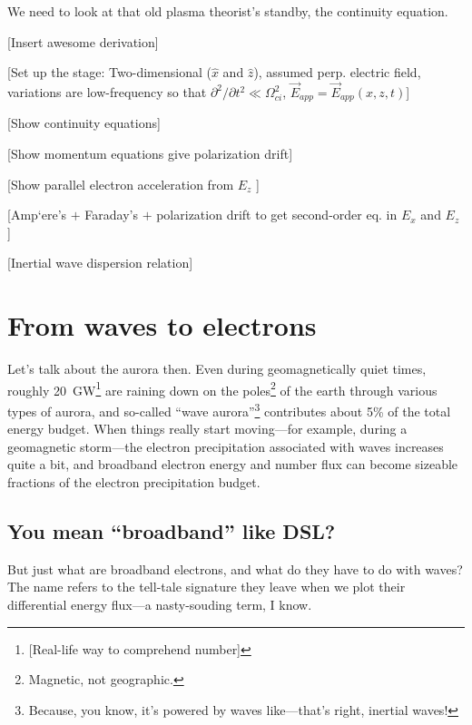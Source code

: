 We need to look at that old plasma theorist's standby, the continuity
equation.

[Insert awesome derivation]

[Set up the stage: Two-dimensional ($\hat{x}$ and $\hat{z}$), assumed
perp. electric field, variations are low-frequency so that $\partial^2
/ \partial t^2 \ll \Omega_{ci}^2$, $\vec{E}_{app} = \vec{E}_{app} (x,
z, t)$]

[Show continuity equations]

[Show momentum equations give polarization drift]

[Show parallel electron acceleration from $E_z$ ]

[Amp`{e}re's $+$ Faraday's $+$ polarization drift to get second-order eq. in $E_x$ and $E_z$ ]

[Inertial \Alf wave dispersion relation]

\section{From waves to electrons}

Let's talk about the aurora then. Even during geomagnetically quiet
times, roughly 20~GW\footnote{[Real-life way to comprehend number]}
\citep{Newell2009} are raining down on the poles\footnote{Magnetic,
  not geographic.} of the earth through various types of aurora, and
so-called ``wave aurora''\footnote{Because, you know, it's powered by
  waves like---that's right, inertial \Alf waves!} contributes about
5\% of the total energy budget. When things really start moving---for
example, during a geomagnetic storm---the electron precipitation
associated with \Alf waves increases quite a bit, and broadband
electron energy and number flux can become sizeable fractions of the
electron precipitation budget.

\subsection{You mean ``broadband'' like DSL?}

But just what are broadband electrons, and what do they have to do
with \Alf waves? The name refers to the tell-tale signature they leave
when we plot their differential energy flux---a nasty-souding term, I
know.

